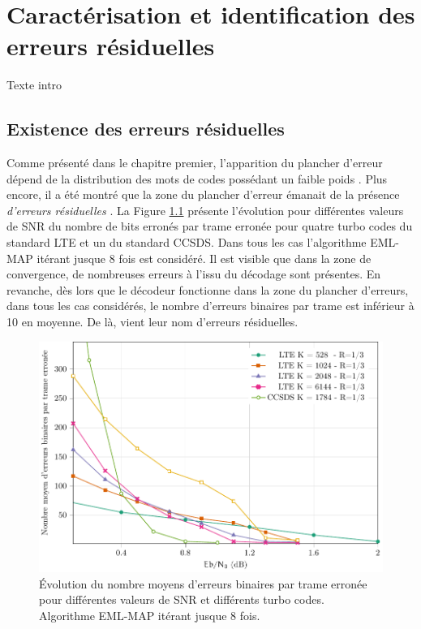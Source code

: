 \chapter{Caractérisation et identification des erreurs résiduelles} %

Texte intro

\vspace*{\fill}
\minitocTITI
\vspace*{\fill}
\newpage

\section{Existence des erreurs résiduelles}
Comme présenté dans le chapitre premier, l'apparition du plancher d'erreur dépend de la distribution des mots de codes 
possédant un faible poids \cite{distance_spectrum}. Plus encore, il a été montré que la zone du plancher d'erreur émanait 
de la présence \emph{d'erreurs résiduelles} \cite{takeshitaBCH}. 
La Figure \ref{fig:befe} présente l'évolution pour différentes valeurs de SNR du nombre de bits erronés par trame 
erronée pour quatre turbo codes du standard LTE et un du standard CCSDS. Dans tous les cas l'algorithme EML-MAP itérant 
jusque 8 fois est considéré. Il est visible que dans la zone de convergence, de nombreuses erreurs à l'issu du décodage
sont présentes. En revanche, dès lors que le décodeur fonctionne dans la zone du plancher d'erreurs, dans tous les cas
considérés, le nombre d'erreurs binaires par trame est inférieur à 10 en moyenne. De là, vient leur nom d'erreurs résiduelles.

\begin{figure}[!b]
	\centering
	\includegraphics[width=.8\textwidth]{main/ch3_fig/be/tikz/befe.pdf}
	\caption{Évolution du nombre moyens d'erreurs binaires par trame erronée pour différentes valeurs de SNR et différents
	turbo codes. Algorithme EML-MAP itérant jusque 8 fois. \label{fig:befe}}
\end{figure}

